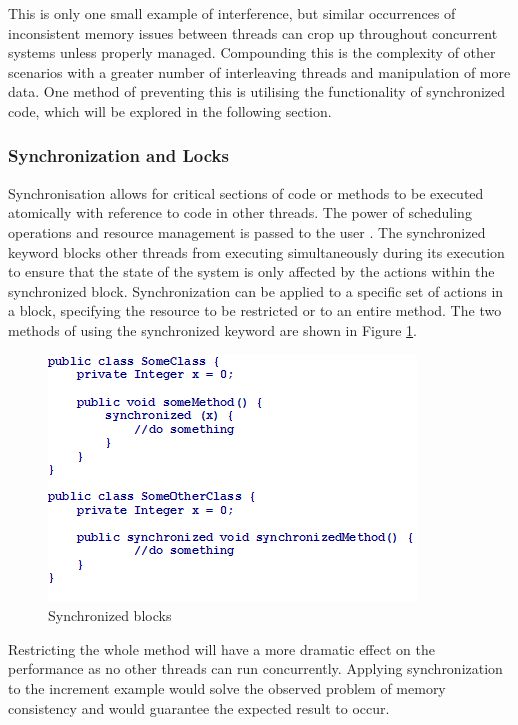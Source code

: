 \documentclass[a4paper,12pt]{article}
\begin{document}
 

This is only one small example of interference, but similar occurrences of inconsistent memory issues between threads can crop up throughout concurrent systems unless properly managed. Compounding this is the complexity of other scenarios with a greater number of interleaving threads and manipulation of more data. One method of preventing this is utilising the functionality of synchronized code, which will be explored in the following section.


\subsubsection{Synchronization and Locks}
    
Synchronisation allows for critical sections of code or methods to be executed atomically with reference to code in other threads. The power of scheduling operations and resource management is passed to the user \citep{silberschatz13}. The synchronized keyword blocks other threads from executing simultaneously during its execution to ensure that the state of the system is only affected by the actions within the synchronized block. Synchronization can be applied to a specific set of actions in a block, specifying the resource to be restricted or to an entire method. The two methods of using the synchronized keyword are shown in Figure \ref{fig:synchronized}. 

\begin{figure}[h]
    \includegraphics{synchronized.png}
    \caption{Synchronized blocks}
    \label{fig:synchronized}
\end{figure}

Restricting the whole method will have a more dramatic effect on the performance as no other threads can run concurrently. Applying synchronization to the increment example would solve the observed problem of memory consistency and would guarantee the expected result to occur.
\end{document}
